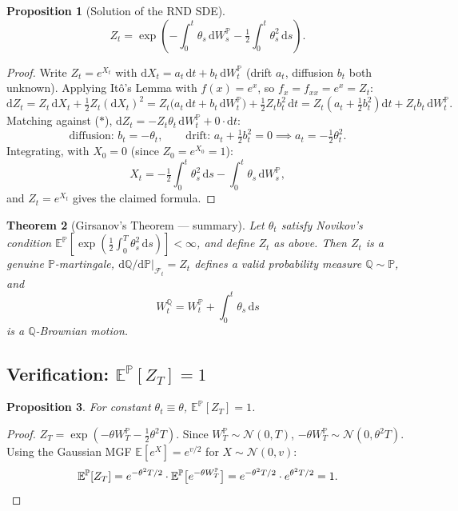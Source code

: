 \documentclass[11pt]{article}
\newtheorem{theorem}{Theorem}[section]
\newtheorem{proposition}[theorem]{Proposition}
\theoremstyle{definition}
\theoremstyle{remark}
\newcommand{\dd}{\mathrm{d}}
\newcommand{\E}{\mathbb{E}}
\renewcommand{\P}{\mathbb{P}}
\newcommand{\Q}{\mathbb{Q}}
\newcommand{\F}{\mathcal{F}}
\newcommand{\N}{\mathcal{N}}
\begin{document}
\begin{proposition}[Solution of the RND SDE]
\[
Z_t = \exp\!\left(-\int_0^t\theta_s\,\dd W_s^\P - \tfrac12\int_0^t\theta_s^2\,\dd s\right).
\]
\end{proposition}

\begin{proof}
Write $Z_t = e^{X_t}$ with $\dd X_t = a_t\,\dd t + b_t\,\dd W_t^\P$ (drift $a_t$, diffusion $b_t$
both unknown). Applying Itô's Lemma with $f(x)=e^x$, so $f_x=f_{xx}=e^x=Z_t$:
\[
\dd Z_t = Z_t\,\dd X_t + \tfrac12 Z_t(\dd X_t)^2
= Z_t\big(a_t\,\dd t + b_t\,\dd W_t^\P\big) + \tfrac12 Z_t b_t^2\,\dd t
= Z_t\!\left(a_t+\tfrac12 b_t^2\right)\dd t + Z_tb_t\,\dd W_t^\P.
\]
Matching against ($\ast$), $\dd Z_t = -Z_t\theta_t\,\dd W_t^\P + 0\cdot\dd t$:
\[
\text{diffusion: } b_t = -\theta_t, \qquad
\text{drift: } a_t + \tfrac12 b_t^2 = 0 \implies a_t = -\tfrac12\theta_t^2.
\]
Integrating, with $X_0=0$ (since $Z_0=e^{X_0}=1$):
\[
X_t = -\tfrac12\int_0^t\theta_s^2\,\dd s - \int_0^t\theta_s\,\dd W_s^\P,
\]
and $Z_t = e^{X_t}$ gives the claimed formula.
\end{proof}

\begin{theorem}[Girsanov's Theorem — summary]
Let $\theta_t$ satisfy Novikov's condition
$\E^\P\!\left[\exp\!\left(\tfrac12\int_0^T\theta_s^2\,\dd s\right)\right] < \infty$, and define
$Z_t$ as above. Then $Z_t$ is a genuine $\P$-martingale, $\dd\Q/\dd\P|_{\F_t} = Z_t$ defines a valid
probability measure $\Q \sim \P$, and
\[
W_t^\Q = W_t^\P + \int_0^t\theta_s\,\dd s
\]
is a $\Q$-Brownian motion.
\end{theorem}

\subsection{Verification: $\E^\P[Z_T]=1$}

\begin{proposition}
For constant $\theta_t \equiv \theta$, $\E^\P[Z_T] = 1$.
\end{proposition}
\begin{proof}
$Z_T = \exp\!\left(-\theta W_T^\P - \tfrac12\theta^2T\right)$. Since $W_T^\P \sim \N(0,T)$,
$-\theta W_T^\P \sim \N(0,\theta^2T)$. Using the Gaussian MGF $\E[e^X] = e^{v/2}$ for $X\sim\N(0,v)$:
\[
\E^\P[Z_T] = e^{-\theta^2T/2}\cdot\E^\P\big[e^{-\theta W_T^\P}\big] = e^{-\theta^2T/2}\cdot e^{\theta^2T/2} = 1. \qedhere
\]
\end{proof}
\end{document}
